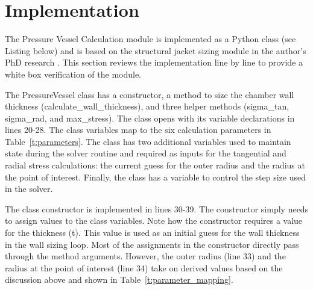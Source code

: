 \documentclass{article}
\begin{document}
\section{Implementation}
The Pressure Vessel Calculation module is implemented as a Python class (see Listing below) and is based on the structural jacket sizing module in the author's PhD research \cite{Simmons2014}.  This section reviews the implementation line by line to provide a white box verification of the module.  

The PressureVessel class has a constructor, a method to size the chamber wall thickness (calculate\_wall\_thickness), and three helper methods (sigma\_tan, sigma\_rad, and max\_stress).  The class opens with its variable declarations in lines 20-28.  The class variables map to the six calculation parameters in Table~\ref{t:parameters}.  The class has two additional variables used to maintain state during the solver routine and required as inputs for the tangential and radial stress calculations: the current guess for the outer radius and the radius at the point of interest.  Finally, the class has a variable to control the step size used in the solver.  

The class constructor is implemented in lines 30-39.  The constructor simply needs to assign values to the class variables.  Note how the constructor requires a value for the thickness (t).  This value is used as an initial guess for the wall thickness in the wall sizing loop.  Most of the assignments in the constructor directly pass through the method arguments.  However, the outer radius (line 33) and the radius at the point of interest (line 34) take on derived values based on the discussion above and shown in Table~\ref{t:parameter_mapping}.

\inputminted[breaklines,linenos,frame=lines,framesep=2.0\fboxsep]{python}{pressure_vessel_calcs.py}
\end{document}
